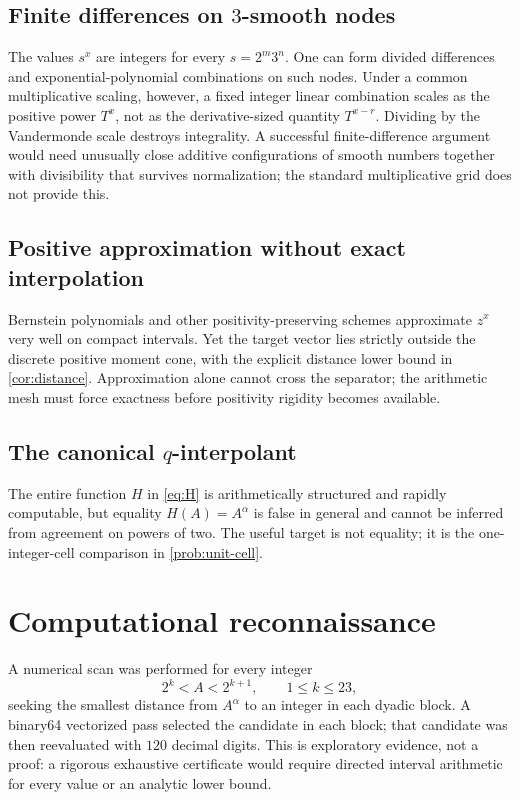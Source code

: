 \documentclass[11pt]{article}
\theoremstyle{definition}
\begin{document}
\subsection{Finite differences on $3$-smooth nodes}
The values $s^x$ are integers for every $s=2^m3^n$.  One can form divided differences and exponential-polynomial combinations on such nodes.  Under a common multiplicative scaling, however, a fixed integer linear combination scales as the positive power $T^x$, not as the derivative-sized quantity $T^{x-r}$.  Dividing by the Vandermonde scale destroys integrality.  A successful finite-difference argument would need unusually close additive configurations of smooth numbers together with divisibility that survives normalization; the standard multiplicative grid does not provide this.

\subsection{Positive approximation without exact interpolation}
Bernstein polynomials and other positivity-preserving schemes approximate $z^x$ very well on compact intervals.  Yet the target vector lies strictly outside the discrete positive moment cone, with the explicit distance lower bound in \cref{cor:distance}.  Approximation alone cannot cross the separator; the arithmetic mesh must force exactness before positivity rigidity becomes available.

\subsection{The canonical $q$-interpolant}
The entire function $H$ in \eqref{eq:H} is arithmetically structured and rapidly computable, but equality $H(A)=A^\alpha$ is false in general and cannot be inferred from agreement on powers of two.  The useful target is not equality; it is the one-integer-cell comparison in \cref{prob:unit-cell}.

\section{Computational reconnaissance}\label{sec:computation}

A numerical scan was performed for every integer
\[
 2^k<A<2^{k+1},\qquad 1\le k\le23,
\]
seeking the smallest distance from $A^\alpha$ to an integer in each dyadic block.  A binary64 vectorized pass selected the candidate in each block; that candidate was then reevaluated with $120$ decimal digits.  This is exploratory evidence, not a proof: a rigorous exhaustive certificate would require directed interval arithmetic for every value or an analytic lower bound.
\end{document}

